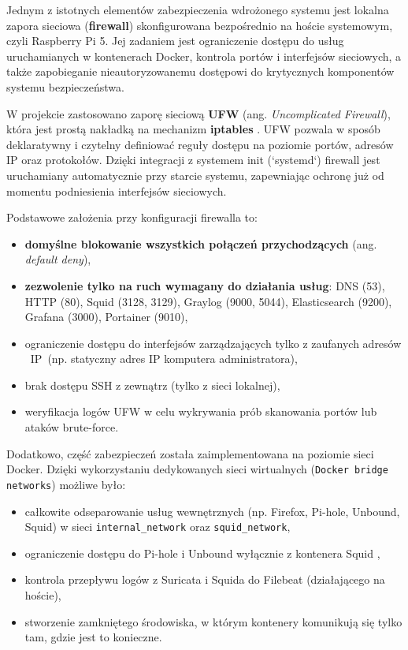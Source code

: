 \documentclass[
    left=2.5cm,         %
    right=2.5cm,        %
    top=2.5cm,          %
    bottom=3cm,         %
    bindingoffset=6mm,  %
    nohyphenation=true %
]{eiti/eiti-thesis} %
\begin{document}
Jednym z istotnych elementów zabezpieczenia wdrożonego systemu jest lokalna zapora sieciowa (\textbf{firewall}) skonfigurowana bezpośrednio na hoście systemowym, czyli Raspberry Pi 5. Jej zadaniem jest ograniczenie dostępu do usług uruchamianych w kontenerach Docker, kontrola portów i interfejsów sieciowych, a także zapobieganie nieautoryzowanemu dostępowi do krytycznych komponentów systemu bezpieczeństwa.

W projekcie zastosowano zaporę sieciową \textbf{UFW} (ang. \textit{Uncomplicated Firewall}), która jest prostą nakładką na mechanizm \textbf{iptables} \cite{ufw-docs}. UFW pozwala w sposób deklaratywny i czytelny definiować reguły dostępu na poziomie portów, adresów IP oraz protokołów. Dzięki integracji z systemem init (`systemd`) firewall jest uruchamiany automatycznie przy starcie systemu, zapewniając ochronę już od momentu podniesienia interfejsów sieciowych.

Podstawowe założenia przy konfiguracji firewalla to:
\begin{itemize}
    \item \textbf{domyślne blokowanie wszystkich połączeń przychodzących} (ang. \textit{default deny}),
    \item \textbf{zezwolenie tylko na ruch wymagany do działania usług}: DNS (53), HTTP (80), Squid (3128, 3129), Graylog (9000, 5044), Elasticsearch (9200), Grafana (3000), Portainer (9010),
    \item ograniczenie dostępu do interfejsów zarządzających tylko z zaufanych adresów ~IP~(np. statyczny adres IP komputera administratora),
    \item brak dostępu SSH z zewnątrz (tylko z sieci lokalnej),
    \item weryfikacja logów UFW w celu wykrywania prób skanowania portów lub ataków brute-force.
\end{itemize}

Dodatkowo, część zabezpieczeń została zaimplementowana na poziomie sieci Docker. Dzięki wykorzystaniu dedykowanych sieci wirtualnych (\texttt{Docker bridge networks}) możliwe było:
\begin{itemize}
    \item całkowite odseparowanie usług wewnętrznych (np. Firefox, Pi-hole, Unbound, Squid) w sieci \texttt{internal\_network} oraz \texttt{squid\_network},
    \item ograniczenie dostępu do Pi-hole i Unbound wyłącznie z kontenera Squid ,
    \item kontrola przepływu logów z Suricata i Squida do Filebeat (działającego na hoście),
    \item stworzenie zamkniętego środowiska, w którym kontenery komunikują się tylko tam, gdzie jest to konieczne.
\end{itemize}
\end{document}
